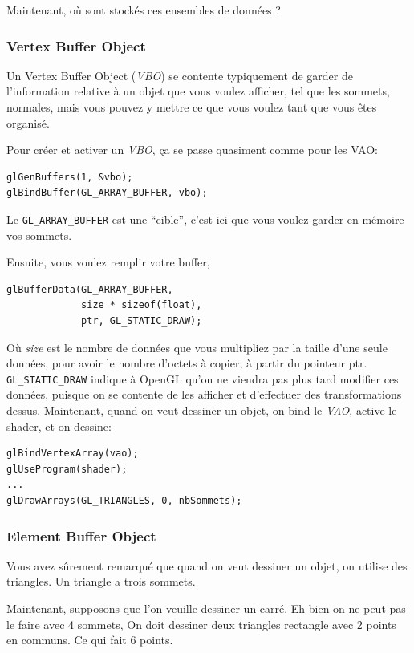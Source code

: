 \documentclass[pdftex, 11pt, a4paper, titlepage]{article}
\begin{document}
Maintenant, où sont stockés ces ensembles de données ?

\subsubsection{Vertex Buffer Object}

Un Vertex Buffer Object (\emph{VBO}) se contente typiquement de garder de
l'information relative à un objet que vous voulez afficher, tel que
les sommets, normales, mais vous pouvez y mettre ce que vous voulez
tant que vous êtes organisé.

Pour créer et activer un \emph{VBO}, ça se passe quasiment comme pour les
VAO:

\begin{lstlisting}
glGenBuffers(1, &vbo);
glBindBuffer(GL_ARRAY_BUFFER, vbo);
\end{lstlisting}

Le \texttt{GL\_ARRAY\_BUFFER} est une ``cible'', c'est ici que vous
voulez garder en mémoire vos sommets.

Ensuite, vous voulez remplir votre buffer,

\begin{lstlisting}
glBufferData(GL_ARRAY_BUFFER,
             size * sizeof(float),
             ptr, GL_STATIC_DRAW);
\end{lstlisting}

Où \textit{size} est le nombre de données que vous multipliez par la taille
d'une seule données, pour avoir le nombre d'octets à copier, à partir
du pointeur ptr.  \texttt{GL\_STATIC\_DRAW} indique à OpenGL qu'on ne
viendra pas plus tard modifier ces données, puisque on se contente de
les afficher et d'effectuer des transformations dessus.
Maintenant, quand on veut dessiner un objet, on bind le \emph{VAO}, active le
shader, et on dessine:

\begin{lstlisting}
glBindVertexArray(vao);
glUseProgram(shader);
...
glDrawArrays(GL_TRIANGLES, 0, nbSommets);
\end{lstlisting}

\pagebreak
\subsubsection{Element Buffer Object}

Vous avez sûrement remarqué que quand on veut dessiner un objet, on
utilise des triangles.  Un triangle a trois sommets.

Maintenant, supposons que l'on veuille dessiner un carré. Eh bien on
ne peut pas le faire avec 4 sommets, On doit dessiner deux triangles
rectangle avec 2 points en communs. Ce qui fait 6 points.
\end{document}
